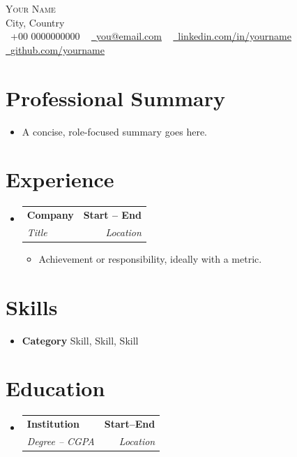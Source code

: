 \documentclass[letterpaper,8pt]{article}
\makeatletter
\newcommand{\resumeItem}[1]{\item\small{#1 \vspace{-2pt}}}
\newcommand{\resumeSubheading}[4]{
  \vspace{-2pt}\item
  \begin{tabular*}{1.0\textwidth}[t]{l@{\extracolsep{\fill}}r}
    \textbf{#1} & \textbf{\small #2} \\
    \textit{\small#3} & \textit{\small #4} \\
  \end{tabular*}\vspace{-7pt}
}
\newcommand{\resumeItemListStart}{\begin{itemize}}
\newcommand{\resumeItemListEnd}{\end{itemize}\vspace{-5pt}}
\newcommand{\resumeSubHeadingListStart}{\begin{itemize}[leftmargin=0.0in, label={}]}
\newcommand{\resumeSubHeadingListEnd}{\end{itemize}}
\makeatother
\begin{document}
\begin{center}
    {\Huge \scshape Your Name} \\ \vspace{1pt}
    City, Country \\ \vspace{1pt}
    \small
    \raisebox{-0.1\height}\faPhone\ +00 0000000000 ~
    \href{mailto:you@email.com}{\raisebox{-0.2\height}\faEnvelope\ \underline{you@email.com}} ~
    \href{https://www.linkedin.com/in/yourname/}{\raisebox{-0.2\height}\faLinkedin\ \underline{linkedin.com/in/yourname}} ~
    \href{https://github.com/yourname}{\raisebox{-0.2\height}\faGithub\ \underline{github.com/yourname}}
\end{center}

\section{Professional Summary}
\begin{itemize}[leftmargin=0in, label={}]
\item A concise, role-focused summary goes here.
\end{itemize}

\section{Experience}
\resumeSubHeadingListStart
\resumeSubheading{Company}{Start -- End}{Title}{Location}
\resumeItemListStart
  \resumeItem{Achievement or responsibility, ideally with a metric.}
\resumeItemListEnd
\resumeSubHeadingListEnd

\section{Skills}
\begin{itemize}[leftmargin=1em,noitemsep]
\item \textbf{Category} \quad Skill, Skill, Skill
\end{itemize}

\section{Education}
\resumeSubHeadingListStart
\resumeSubheading{Institution}{Start--End}{Degree -- CGPA}{Location}
\resumeSubHeadingListEnd
\end{document}
